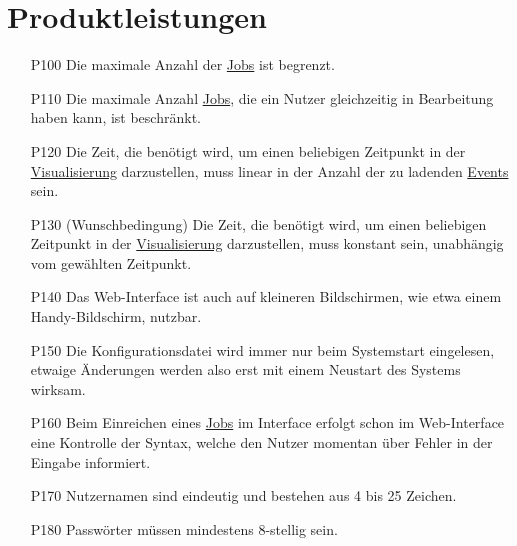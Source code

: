 \section{Produktleistungen}

%

\begin{itemize}[noitemsep]
    \item[P100] Die maximale Anzahl der \hyperref[B:Jobs]{Jobs} ist begrenzt.
    
    \item[P110] Die maximale Anzahl \hyperref[B:Jobs]{Jobs}, die ein \gls{Nutzer} gleichzeitig in Bearbeitung haben kann, ist beschränkt.
    
    \item[P120] Die Zeit, die benötigt wird, um einen beliebigen Zeitpunkt in der \hyperref[pages:visualization]{Visualisierung} darzustellen, muss linear in der Anzahl der zu ladenden \hyperref[B:Event]{Events} sein.
    
    \item[P130] (Wunschbedingung)  Die Zeit, die benötigt wird, um einen beliebigen Zeitpunkt in der \hyperref[pages:visualization]{Visualisierung} darzustellen, muss konstant sein, unabhängig vom gewählten Zeitpunkt.
    
    \item[P140] Das \gls{Web-Interface} ist auch auf kleineren Bildschirmen, wie etwa einem Handy-Bildschirm, nutzbar.
    
    \item[P150] Die \gls{Konfigurationsdatei} wird immer nur beim Systemstart eingelesen, etwaige Änderungen werden also erst mit einem Neustart des Systems wirksam.
    
    \item[P160] Beim Einreichen eines \hyperref[B:Jobs]{Jobs} im Interface erfolgt schon im \gls{Web-Interface} eine Kontrolle der Syntax, welche den \gls{Nutzer} momentan über Fehler in der Eingabe informiert.
    
    \item[P170] Nutzernamen sind eindeutig und bestehen aus 4 bis 25 Zeichen.

    \item[P180] Passwörter müssen mindestens 8-stellig sein.
    

\end{itemize}

